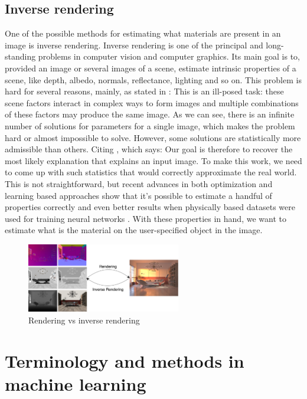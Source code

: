     \subsection{Inverse rendering}
    One of the possible methods for estimating what materials are present in an image is inverse rendering. Inverse rendering is one of the principal and long-standing problems in computer vision and computer graphics. Its main goal is to, provided an image or several images of a scene, estimate intrinsic properties of a scene, like depth, albedo, normals, reflectance, lighting and so on. This problem is hard for several reasons, mainly, as stated in \cite{li-inverse-rendering}: \glqq{}This is an ill-posed task: these scene factors interact in complex ways to form images and multiple combinations of these factors may produce the same image.\grqq{} As we can see, there is an infinite number of solutions for parameters for a single image, which makes the problem hard or almost impossible to solve. However, some solutions are statistically more admissible than others. Citing \cite{BarronTPAMI2015}, which says: \glqq{}Our goal is therefore to recover the most likely explanation that explains an input image.\grqq{} To make this work, we need to come up with such statistics that would correctly approximate the real world. This is not straightforward, but recent advances in both optimization and learning based approaches show that it's possible to estimate a handful of properties correctly \cite{BarronTPAMI2015} and even better results when physically based datasets were used for training neural networks \cite{sengupta-inverse-rendering}\cite{li-inverse-rendering}. With these properties in hand, we want to estimate what is the material on the user-specified object in the image.
    \begin{figure}[H]
        \centerline{\includegraphics[width=0.6\textwidth]{praca/images/Rendering vs Inverse Rendering.png}}
        \caption[Rendering vs inverse rendering]{Rendering vs inverse rendering}
        \label{img:rendering-vs-inverse-rendering}
    \end{figure}
\section{Terminology and methods in machine learning}
